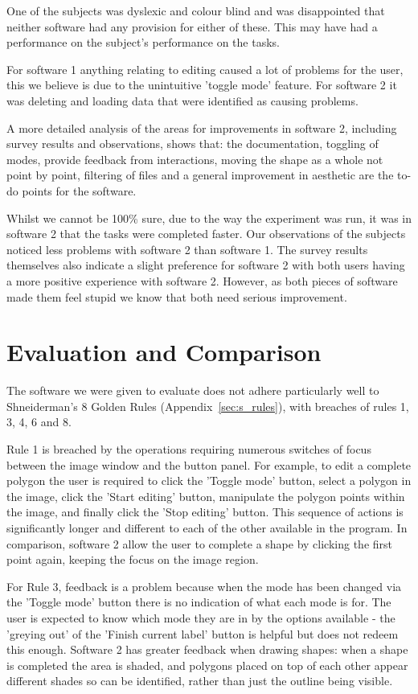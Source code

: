 \documentclass[a4paper,11pt,oneside]{article}
\begin{document}
One of the subjects was dyslexic and colour blind and was disappointed that neither software had any provision for either of these.  This may have had a performance on the subject's performance on the tasks.

For software 1 anything relating to editing caused a lot of problems for the user, this we believe is due to the unintuitive 'toggle mode' feature.  For software 2 it was deleting and loading data that were identified as causing problems.

A more detailed analysis of the areas for improvements in software 2, including survey results and observations, shows that: the documentation, toggling of modes, provide feedback from interactions, moving the shape as a whole not point by point, filtering of files and a general improvement in aesthetic are the to-do points for the software.

Whilst we cannot be 100\% sure, due to the way the experiment was run, it was in software 2 that the tasks were completed faster.  Our observations of the subjects noticed less problems with software 2 than software 1.  The survey results themselves also indicate a slight preference for software 2 with both users having a more positive experience with software 2. However, as both pieces of software made them feel stupid we know that both need serious improvement.

\section{Evaluation and Comparison}

The software we were given to evaluate does not adhere particularly well to Shneiderman's 8 Golden Rules (Appendix~\ref{sec:s_rules}), with breaches of rules 1, 3, 4, 6 and 8. 

Rule 1 is breached by the operations requiring numerous switches of focus between the image window and the button panel. For example, to edit a complete polygon the user is required to click the 'Toggle mode' button, select a polygon in the image, click the 'Start editing' button, manipulate the polygon points within the image, and finally click the 'Stop editing' button. This sequence of actions is significantly longer and different to each of the other available in the program. In comparison, software 2 allow the user to complete a shape by clicking the first point again, keeping the focus on the image region.

For Rule 3, feedback is a problem because when the mode has been changed via the 'Toggle mode' button there is no indication of what each mode is for. The user is expected to know which mode they are in by the options available - the 'greying out' of the 'Finish current label' button is helpful but does not redeem this enough. Software 2 has greater feedback when drawing shapes: when a shape is completed the area is shaded, and polygons placed on top of each other appear different shades so can be identified, rather than just the outline being visible.
\end{document}

